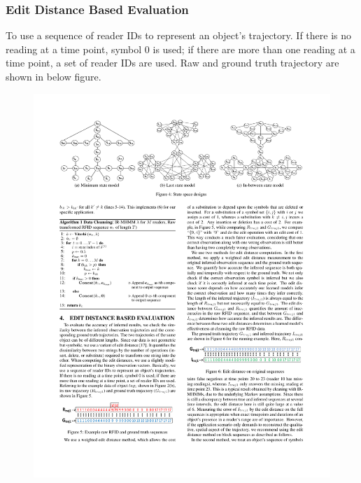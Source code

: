 \begin{frame}
\frametitle{Edit Distance Based Evaluation}

To use a sequence of reader IDs to represent an object's trajectory. If there is no reading at a time point, symbol 0 is used; if there are more than one reading at a time point, a set of reader IDs are used. Raw and ground truth trajectory are shown in below figure.

\begin{figure}[tb]
  \includegraphics[width=\columnwidth]{figures/3-5/3-5-10.pdf}
\end{figure}

\end{frame}


